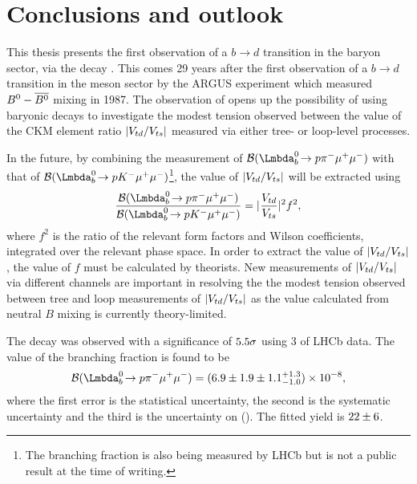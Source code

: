\chapter{Conclusions and outlook}

This thesis presents the first observation of a $b\to d$ transition in the baryon sector, via the decay \Lbpi. This comes 29 years after the first observation of a $b\to d$ transition in the meson sector by the ARGUS experiment which measured ${{B}^0}-\overline{{{B}^0}}$ mixing in 1987\cite{ARGUS}. The observation of \Lbpi opens up the possibility of using baryonic decays to investigate the modest tension observed \cite{vtdvts} between the value of the CKM element ratio $|{V_{{t}{d}}}/{V_{{t}{s}}}|$ measured via either tree- or loop-level processes.

In the future, by combining the measurement of $\BF(\Lbpi)$ with that of $\BF(\LbK)$\footnote{The \LbK branching fraction is also being measured by LHCb but is not a public result at the time of writing.}, the value of $|{V_{{t}{d}}}/{V_{{t}{s}}}|$ will be extracted using
\begin{equation}
  \frac{\BF(\Lbpi)}{\BF(\LbK)} = |^{}\frac{\Vtd}{\Vts}|^{2}f^{2},
  \label{eq:R}
\end{equation}
where $f^{2}$ is the ratio of the relevant form factors and Wilson coefficients, integrated over the relevant phase space. In order to extract the value of $|{V_{{t}{d}}}/{V_{{t}{s}}}|$, the value of $f$ must be calculated by theorists. New measurements of $|{V_{{t}{d}}}/{V_{{t}{s}}}|$ via different channels are important in resolving the the modest tension observed between tree and loop measurements of $|{V_{{t}{d}}}/{V_{{t}{s}}}|$ as the value calculated from neutral $B$ mixing is currently theory-limited. %

The \Lbpi decay was observed with a significance of $5.5\sigma$ using 3 \invfb of LHCb data. The value of the \Lbpi branching fraction is found to be
\begin{equation}
    \BF(\Lbpi)  = \BFV, %
\end{equation}
where the first error is the statistical uncertainty, the second is the systematic uncertainty and the third is the uncertainty on \BF(\Lbpijpsi). The fitted \Lbpi yield is $22\pm6$.


